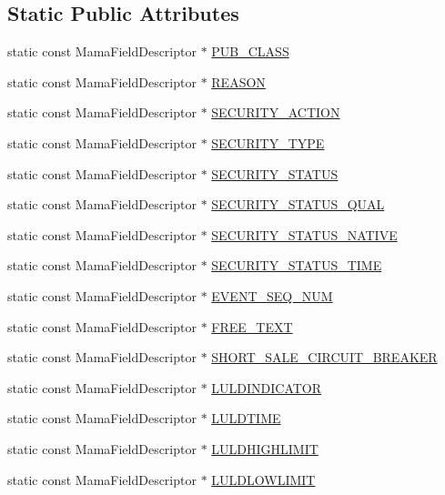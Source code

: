 \subsection*{Static Public Attributes}
\begin{CompactItemize}
\item 
static const Mama\-Field\-Descriptor $\ast$ \hyperlink{classWombat_1_1MamdaSecStatusFields_cb411ef6db5eadef356f8eb09f752265}{PUB\_\-CLASS}
\item 
static const Mama\-Field\-Descriptor $\ast$ \hyperlink{classWombat_1_1MamdaSecStatusFields_14d9e1339db83fffe57a1e211f747456}{REASON}
\item 
static const Mama\-Field\-Descriptor $\ast$ \hyperlink{classWombat_1_1MamdaSecStatusFields_1d485dd0267c6fbb41afc51c39612b63}{SECURITY\_\-ACTION}
\item 
static const Mama\-Field\-Descriptor $\ast$ \hyperlink{classWombat_1_1MamdaSecStatusFields_168c233714e52c248760a8be2fedc56c}{SECURITY\_\-TYPE}
\item 
static const Mama\-Field\-Descriptor $\ast$ \hyperlink{classWombat_1_1MamdaSecStatusFields_08b4fa5f438fab93dce14bd693f02476}{SECURITY\_\-STATUS}
\item 
static const Mama\-Field\-Descriptor $\ast$ \hyperlink{classWombat_1_1MamdaSecStatusFields_f95de09df2db9954afecc1d0e5c8a9ed}{SECURITY\_\-STATUS\_\-QUAL}
\item 
static const Mama\-Field\-Descriptor $\ast$ \hyperlink{classWombat_1_1MamdaSecStatusFields_165f4445e71a5b2390d1ea2dcbb5ee7e}{SECURITY\_\-STATUS\_\-NATIVE}
\item 
static const Mama\-Field\-Descriptor $\ast$ \hyperlink{classWombat_1_1MamdaSecStatusFields_1ecf812ee874ff88684efce54ba3fcae}{SECURITY\_\-STATUS\_\-TIME}
\item 
static const Mama\-Field\-Descriptor $\ast$ \hyperlink{classWombat_1_1MamdaSecStatusFields_1f28d36c8607d7892514042b9038ca7a}{EVENT\_\-SEQ\_\-NUM}
\item 
static const Mama\-Field\-Descriptor $\ast$ \hyperlink{classWombat_1_1MamdaSecStatusFields_95f43e98c060cfc9be64200ca481f55f}{FREE\_\-TEXT}
\item 
static const Mama\-Field\-Descriptor $\ast$ \hyperlink{classWombat_1_1MamdaSecStatusFields_4c83e286a950d8339ecb6ded8ac81973}{SHORT\_\-SALE\_\-CIRCUIT\_\-BREAKER}
\item 
static const Mama\-Field\-Descriptor $\ast$ \hyperlink{classWombat_1_1MamdaSecStatusFields_4f09f557ade9e5f3a938b017dfe7e310}{LULDINDICATOR}
\item 
static const Mama\-Field\-Descriptor $\ast$ \hyperlink{classWombat_1_1MamdaSecStatusFields_01ebfb00008b7e2aa243bec653c565d4}{LULDTIME}
\item 
static const Mama\-Field\-Descriptor $\ast$ \hyperlink{classWombat_1_1MamdaSecStatusFields_6242c574f7cd90f90335c62426ee13c8}{LULDHIGHLIMIT}
\item 
static const Mama\-Field\-Descriptor $\ast$ \hyperlink{classWombat_1_1MamdaSecStatusFields_e094d04fdb1790325f2dea6e600fffb6}{LULDLOWLIMIT}
\end{CompactItemize}


